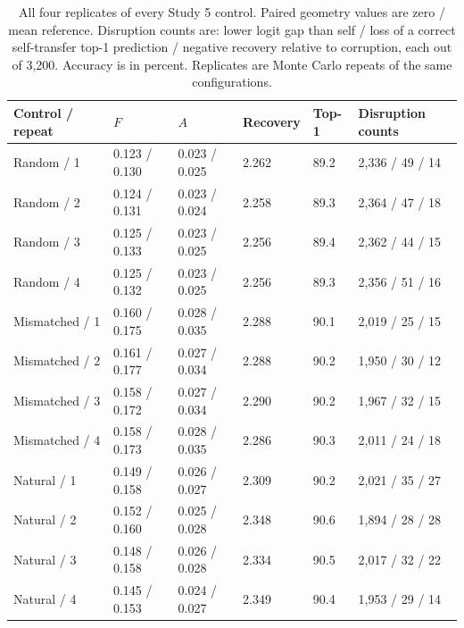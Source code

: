 \begin{table}[H]
\centering\footnotesize
\setlength{\tabcolsep}{3pt}
\caption{All four replicates of every Study 5 control. Paired geometry values are zero / mean reference. Disruption counts are: lower logit gap than self / loss of a correct self-transfer top-1 prediction / negative recovery relative to corruption, each out of 3,200. Accuracy is in percent. Replicates are Monte Carlo repeats of the same configurations.}
\label{tab:null-replicates}
\begin{tabularx}{\linewidth}{@{}lYYYYY@{}}
\toprule
Control / repeat & $F$ & $A$ & Recovery & Top-1 & Disruption counts \\
\midrule
Random / 1 & 0.123 / 0.130 & 0.023 / 0.025 & 2.262 & 89.2 & 2,336 / 49 / 14 \\
Random / 2 & 0.124 / 0.131 & 0.023 / 0.024 & 2.258 & 89.3 & 2,364 / 47 / 18 \\
Random / 3 & 0.125 / 0.133 & 0.023 / 0.025 & 2.256 & 89.4 & 2,362 / 44 / 15 \\
Random / 4 & 0.125 / 0.132 & 0.023 / 0.025 & 2.256 & 89.3 & 2,356 / 51 / 16 \\
Mismatched / 1 & 0.160 / 0.175 & 0.028 / 0.035 & 2.288 & 90.1 & 2,019 / 25 / 15 \\
Mismatched / 2 & 0.161 / 0.177 & 0.027 / 0.034 & 2.288 & 90.2 & 1,950 / 30 / 12 \\
Mismatched / 3 & 0.158 / 0.172 & 0.027 / 0.034 & 2.290 & 90.2 & 1,967 / 32 / 15 \\
Mismatched / 4 & 0.158 / 0.173 & 0.028 / 0.035 & 2.286 & 90.3 & 2,011 / 24 / 18 \\
Natural / 1 & 0.149 / 0.158 & 0.026 / 0.027 & 2.309 & 90.2 & 2,021 / 35 / 27 \\
Natural / 2 & 0.152 / 0.160 & 0.025 / 0.028 & 2.348 & 90.6 & 1,894 / 28 / 28 \\
Natural / 3 & 0.148 / 0.158 & 0.026 / 0.028 & 2.334 & 90.5 & 2,017 / 32 / 22 \\
Natural / 4 & 0.145 / 0.153 & 0.024 / 0.027 & 2.349 & 90.4 & 1,953 / 29 / 14 \\
\bottomrule
\end{tabularx}
\end{table}

